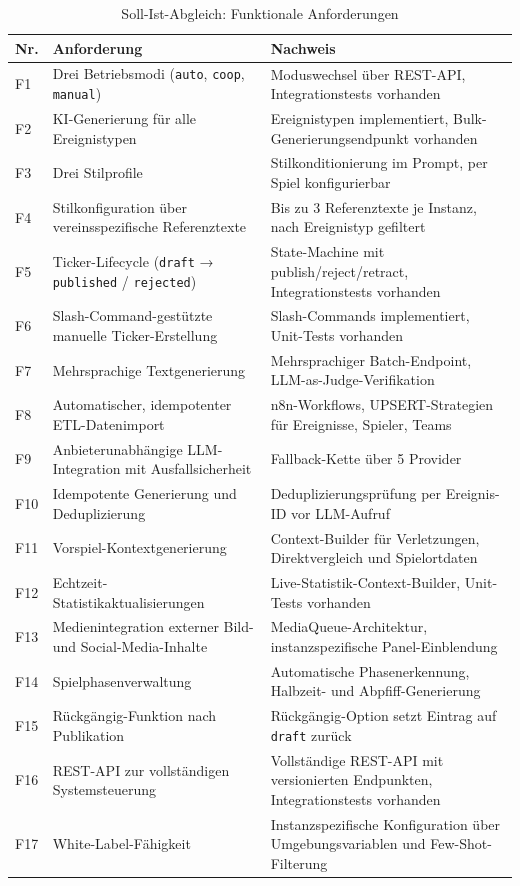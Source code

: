 \begin{longtable}[]{@{}
  >{\raggedright\arraybackslash}p{}
  >{\raggedright\arraybackslash}p{}
  >{\raggedright\arraybackslash}p{}@{}}
\caption{Soll-Ist-Abgleich: Funktionale Anforderungen}\label{tab:soll-ist-funktional}\\
\toprule\noalign{}
Nr. & Anforderung & Nachweis \\
\midrule\noalign{}
\endhead
\bottomrule\noalign{}
\endlastfoot
F1 & Drei Betriebsmodi (\texttt{auto}, \texttt{coop}, \texttt{manual}) & Moduswechsel über REST-API, Integrationstests vorhanden \\
F2 & KI-Generierung für alle Ereignistypen & 24 Ereignistypen implementiert, Bulk-Generierungsendpunkt vorhanden \\
F3 & Drei Stilprofile & Stilkonditionierung im Prompt, per Spiel konfigurierbar \\
F4 & Stilkonfiguration über vereinsspezifische Referenztexte & Bis zu 3 Referenztexte je Instanz, nach Ereignistyp gefiltert \\
F5 & Ticker-Lifecycle (\texttt{draft} → \texttt{published} / \texttt{rejected}) & State-Machine mit publish/reject/retract, Integrationstests vorhanden \\
F6 & Slash-Command-gestützte manuelle Ticker-Erstellung & 25 Slash-Commands implementiert, Unit-Tests vorhanden \\
F7 & Mehrsprachige Textgenerierung & Mehrsprachiger Batch-Endpoint, LLM-as-Judge-Verifikation \\
F8 & Automatischer, idempotenter ETL-Datenimport & 17 n8n-Workflows, UPSERT-Strategien für Ereignisse, Spieler, Teams \\
F9 & Anbieterunabhängige LLM-Integration mit Ausfallsicherheit & Fallback-Kette über 5 Provider \\
F10 & Idempotente Generierung und Deduplizierung & Deduplizierungsprüfung per Ereignis-ID vor LLM-Aufruf \\
F11 & Vorspiel-Kontextgenerierung & 7 Context-Builder für Verletzungen, Direktvergleich und Spielortdaten \\
F12 & Echtzeit-Statistikaktualisierungen & Live-Statistik-Context-Builder, Unit-Tests vorhanden \\
F13 & Medienintegration externer Bild- und Social-Media-Inhalte & MediaQueue-Architektur, instanzspezifische Panel-Einblendung \\
F14 & Spielphasenverwaltung & Automatische Phasenerkennung, Halbzeit- und Abpfiff-Generierung \\
F15 & Rückgängig-Funktion nach Publikation & Rückgängig-Option setzt Eintrag auf \texttt{draft} zurück \\
F16 & REST-API zur vollständigen Systemsteuerung & Vollständige REST-API mit versionierten Endpunkten, Integrationstests vorhanden \\
F17 & White-Label-Fähigkeit & Instanzspezifische Konfiguration über Umgebungsvariablen und Few-Shot-Filterung \\
\end{longtable}

